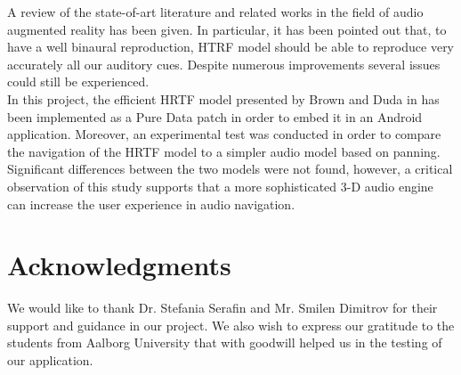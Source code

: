 \documentclass[journal]{IEEEtran}
\begin{document}
A review of the state-of-art literature and related works in the field of audio augmented reality has been given. In particular, it has been pointed out that, to have a well binaural reproduction, HTRF model should be able to reproduce very accurately all our auditory cues. Despite numerous improvements several issues could still be experienced. \\

In this project, the efficient HRTF model presented by Brown and Duda in \cite{Brown1997} has been implemented as a Pure Data patch in order to embed it in an Android application. Moreover, an experimental test was conducted in order to compare the navigation of the HRTF model to a simpler audio model based on panning. Significant differences between the two models were not found, however, a critical observation of this study supports that a more sophisticated 3-D audio engine can increase the user experience in audio navigation.

\section*{Acknowledgments}

We would like to thank Dr. Stefania Serafin and Mr. Smilen Dimitrov for their support and guidance in our project. We also wish to express our gratitude to the students from Aalborg University that with goodwill helped us in the testing of our application.









\end{document}
